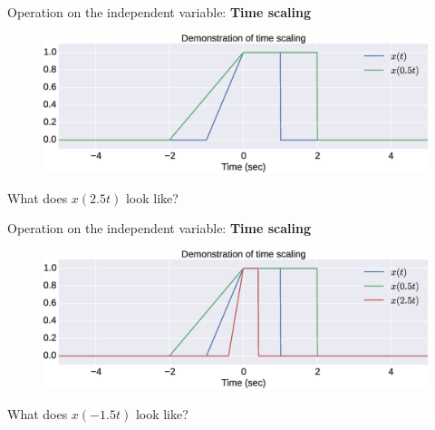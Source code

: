 \documentclass{beamer}
\begin{document}
\begin{frame}{Operation on the independent variable: \textbf{Time scaling}}

\begin{figure}
\includegraphics[width=\textwidth]{img/tscale1.eps}
\end{figure}

What does $x(2.5t)$ look like?

\end{frame}

\begin{frame}{Operation on the independent variable: \textbf{Time scaling}}

\begin{figure}
\includegraphics[width=\textwidth]{img/tscale2.eps}
\end{figure}

What does $x(-1.5t)$ look like?

\end{frame}
\end{document}
